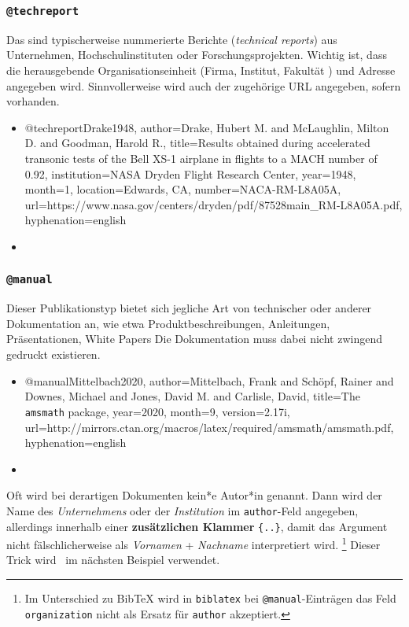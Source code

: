 \subsubsection{\texttt{@techreport}}
\label{sec:@techreport}
Das sind typischerweise nummerierte Berichte (\emph{technical reports}) aus Unternehmen, 
Hochschulinstituten oder Forschungsprojekten.
Wichtig ist, dass die herausgebende Organisationseinheit (Firma, Institut, Fakultät \etc) und 
Adresse angegeben wird. Sinnvollerweise wird auch der zugehörige URL angegeben, sofern vorhanden. 
%
\begin{itemize}
\item[]
\begin{GenericCode}[numbers=none]
@techreport{Drake1948,
  author={Drake, Hubert M. and McLaughlin, Milton D. and Goodman, Harold R.},
  title={Results obtained during accelerated transonic tests of the {Bell} {XS-1} airplane in flights to a {MACH} number of 0.92},
  institution={NASA Dryden Flight Research Center},
  year={1948},
  month={1},
  location={Edwards, CA},
  number={NACA-RM-L8A05A},
  url={https://www.nasa.gov/centers/dryden/pdf/87528main_RM-L8A05A.pdf},
  hyphenation={english}
}
\end{GenericCode}
\item[\cite{Drake1948}] 
\end{itemize}


\subsubsection{\texttt{@manual}}
\label{sec:@manual}
Dieser Publikationstyp bietet sich jegliche Art von technischer oder anderer Dokumentation an, wie etwa Produktbeschreibungen, Anleitungen, Präsentationen, White Papers \usw Die Dokumentation muss dabei nicht zwingend gedruckt existieren.
%
\begin{itemize}
\item[]
\begin{GenericCode}[numbers=none]
@manual{Mittelbach2020,
  author={Mittelbach, Frank and Schöpf, Rainer and Downes, Michael and Jones, David M. and Carlisle, David},
  title={The \texttt{amsmath} package},
  year={2020},
  month={9},
  version={2.17i},
  url={http://mirrors.ctan.org/macros/latex/required/amsmath/amsmath.pdf},
  hyphenation={english}
}
\end{GenericCode}
\item[\cite{Mittelbach2020}] 
\end{itemize}
%
Oft wird bei derartigen Dokumenten kein*e Autor*in genannt. Dann wird der Name des \emph{Unternehmens} oder der \emph{Institution} im \texttt{author}-Feld angegeben, allerdings innerhalb einer \textbf{zusätzlichen Klammer} \texttt{\{..\}}, damit das Argument nicht fälschlicherweise als \emph{Vornamen} + \emph{Nachname} interpretiert wird.%
\footnote{Im Unterschied zu BibTeX wird in \texttt{biblatex} bei \texttt{@manual}-Einträgen das Feld \texttt{organization} nicht als Ersatz für \texttt{author} akzeptiert.}
Dieser Trick wird \ua\ im nächsten Beispiel verwendet.


